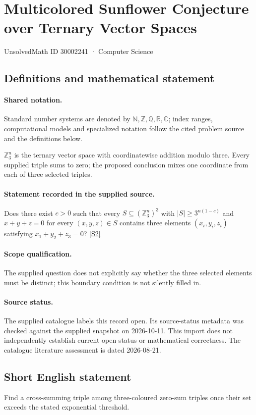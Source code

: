 \documentclass[11pt]{article}
\newcommand{\sref}[2]{\hyperlink{source:#1:#2}{[S#2]}}
\begin{document}
\setcounter{section}{30002240}
\section{Multicolored Sunflower Conjecture over Ternary Vector Spaces}\label{30002241}
{\small\sffamily UnsolvedMath ID 30002241 · Computer Science}
\subsection{Definitions and mathematical statement}

\paragraph{Shared notation.}Standard number systems are denoted by $\mathbb N,\mathbb Z,\mathbb Q,\mathbb R,\mathbb C$; index ranges, computational models and specialized notation follow the cited problem source and the definitions below.


$\mathbb Z_3^n$ is the ternary vector space with coordinatewise addition modulo three. Every supplied triple sums to zero; the proposed conclusion mixes one coordinate from each of three selected triples.
\paragraph{Statement recorded in the supplied source.}
Does there exist $c>0$ such that every $S\subseteq(\mathbb Z_3^n)^3$ with $|S|\geq3^{n(1-c)}$ and $x+y+z=0$ for every $(x,y,z)\in S$ contains three elements $(x_i,y_i,z_i)$ satisfying $x_1+y_2+z_3=0$? \sref{30002241}{2}
\paragraph{Scope qualification.}
The supplied question does not explicitly say whether the three selected elements must be distinct; this boundary condition is not silently filled in.
\paragraph{Source status.}
The supplied catalogue labels this record open. Its source-status metadata was checked against the supplied snapshot on 2026-10-11. This import does not independently establish current open status or mathematical correctness. The catalogue literature assessment is dated 2026-08-21.
\subsection{Short English statement}
Find a cross-summing triple among three-coloured zero-sum triples once their set exceeds the stated exponential threshold.
\end{document}
